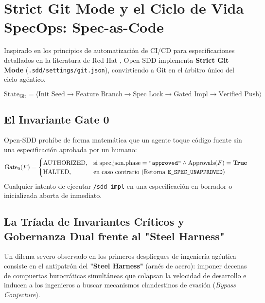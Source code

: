 \documentclass[11pt,a4paper]{article}
\begin{document}
\section{Strict Git Mode y el Ciclo de Vida SpecOps: Spec-as-Code}

Inspirado en los principios de automatización de CI/CD para especificaciones detallados en la literatura de Red Hat \cite{griffin2026spec}, Open-SDD implementa \textbf{Strict Git Mode} (\texttt{.sdd/\allowbreak settings/\allowbreak git.json}), convirtiendo a Git en el árbitro único del ciclo agéntico.

\begin{equation}
    \text{State}_{\text{Git}} = \langle \text{Init Seed} \longrightarrow \text{Feature Branch} \longrightarrow \text{Spec Lock} \longrightarrow \text{Gated Impl} \longrightarrow \text{Verified Push} \rangle
\end{equation}

\subsection{El Invariante Gate 0}
Open-SDD prohíbe de forma matemática que un agente toque código fuente sin una especificación aprobada por un humano:
\begin{equation}
    \text{Gate}_0(F) = 
    \begin{cases} 
        \text{AUTHORIZED}, & \text{si } \text{spec.json}.\text{phase} = \texttt{"approved"} \land \text{Approvals}(F) = \mathbf{True} \\
        \text{HALTED}, & \text{en caso contrario (Retorna \texttt{E\_SPEC\_UNAPPROVED})}
    \end{cases}
\end{equation}
Cualquier intento de ejecutar \texttt{/sdd-impl} en una especificación en borrador o inicializada aborta de inmediato.

\subsection{La Tríada de Invariantes Críticos y Gobernanza Dual frente al "Steel Harness"}
Un dilema severo observado en los primeros despliegues de ingeniería agéntica consiste en el antipatrón del \textbf{"Steel Harness"} (arnés de acero): imponer decenas de compuertas burocráticas simultáneas que colapsan la velocidad de desarrollo e inducen a los ingenieros a buscar mecanismos clandestinos de evasión (\textit{Bypass Conjecture}).
\end{document}

